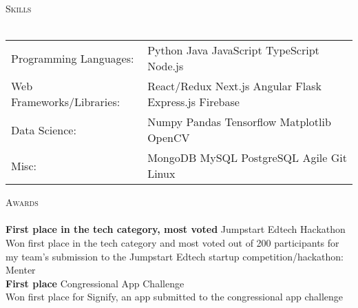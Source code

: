 \documentclass[a4paper]{article}
\newcommand{\lineunder} {
    \vspace*{-8pt} \\
    \hspace*{-18pt} \hrulefill \\
}
\newcommand{\header} [1] {
    {\hspace*{-18pt}\vspace*{6pt} \textsc{#1}}
    \vspace*{-6pt} \lineunder
}
\begin{document}
\header{Skills}
\begin{tabular}{ l l }
	Programming Languages: & Python Java JavaScript TypeScript Node.js             \\
	Web Frameworks/Libraries:  & React/Redux Next.js Angular Flask Express.js Firebase \\
	Data Science:          & Numpy Pandas Tensorflow Matplotlib OpenCV                           \\
	Misc:             & MongoDB MySQL PostgreSQL Agile Git Linux                       \\
\end{tabular}
\vspace{2mm}

\header{Awards}
\textbf{First place in the tech category, most voted} \hfill Jumpstart Edtech Hackathon\\
Won first place in the tech category and most voted out of 200 participants for my team’s submission to the Jumpstart Edtech startup competition/hackathon: Menter\\
\vspace*{2mm}
\textbf{First place} \hfill Congressional App Challenge\\
Won first place for Signify, an app submitted to the congressional app challenge\\

\ 
\end{document}
